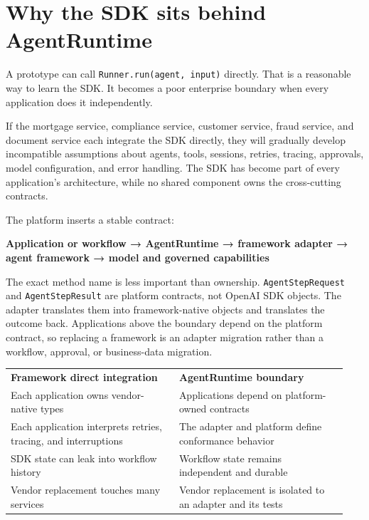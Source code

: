 \section{Why the SDK sits behind AgentRuntime}

A prototype can call \lstinline[style=bookinline]!Runner.run(agent, input)! directly. That is a reasonable way to learn the SDK. It becomes a poor enterprise boundary when every application does it independently.\par

If the mortgage service, compliance service, customer service, fraud service, and document service each integrate the SDK directly, they will gradually develop incompatible assumptions about agents, tools, sessions, retries, tracing, approvals, model configuration, and error handling. The SDK has become part of every application’s architecture, while no shared component owns the cross-cutting contracts.\par

The platform inserts a stable contract:\par

\textbf{Application or workflow → AgentRuntime → framework adapter → agent framework → model and governed capabilities}\par

The exact method name is less important than ownership. \lstinline[style=bookinline]!AgentStepRequest! and \lstinline[style=bookinline]!AgentStepResult! are platform contracts, not OpenAI SDK objects. The adapter translates them into framework-native objects and translates the outcome back. Applications above the boundary depend on the platform contract, so replacing a framework is an adapter migration rather than a workflow, approval, or business-data migration.\par

\BookTableStart
\small
\begin{tabular}{@{}Y{0.4700\linewidth}Y{0.4700\linewidth}@{}}
\color{white}\bfseries Framework direct integration & \color{white}\bfseries AgentRuntime boundary \\
Each application owns vendor-native types & Applications depend on platform-owned contracts \\
Each application interprets retries, tracing, and interruptions & The adapter and platform define conformance behavior \\
SDK state can leak into workflow history & Workflow state remains independent and durable \\
Vendor replacement touches many services & Vendor replacement is isolated to an adapter and its tests \\
\end{tabular}
\BookTableEnd

